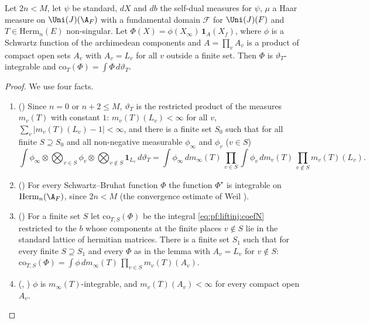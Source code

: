 \begin{lemma}\label{pf:liftinj:swpure}
Let $2n<M$, let $\psi$ be standard, $dX$ and $db$ the self-dual measures for $\psi$, $\mu$ a Haar measure on $\Uni(J)(\A_F)$ with a
fundamental domain $\mathcal F$ for $\Uni(J)(F)$ and $T\in\mathrm{Herm}_n(E)$ non-singular. Let $\Phi(X)=\phi(X_\infty)\,\mathbf 1_A(X_f)$, where $\phi$
is a Schwartz function of the archimedean components and $A=\prod_vA_v$ is a product of compact open sets $A_v$ with $A_v=L_v$ for all $v$
outside a finite set. Then $\Phi$ is $\vartheta_T$-integrable and $\mathrm{co}_T(\Phi)=\int\Phi\,d\vartheta_T$.
\end{lemma}

\begin{proof}
We use four facts.
\begin{enumerate}[label=(\alph*)]
\item () Since $n=0$ or $n+2\le M$, $\vartheta_T$ is the restricted product
of the measures $m_v(T)$ with constant $1$: $m_v(T)(L_v)<\infty$ for all $v$, $\sum_v|m_v(T)(L_v)-1|<\infty$, and there is a finite set $S_0$
such that for all finite $S\supseteq S_0$ and all non-negative measurable $\phi_\infty$ and $\phi_v$ ($v\in S$)
\[
\int\phi_\infty\otimes\bigotimes_{v\in S}\phi_v\otimes\bigotimes_{v\notin S}\mathbf 1_{L_v}\,d\vartheta_T
=\int\phi_\infty\,dm_\infty(T)\,\prod_{v\in S}\int\phi_v\,dm_v(T)\,\prod_{v\notin S}m_v(T)(L_v).
\]
\item () For every Schwartz--Bruhat function $\Phi$ the function $\Phi^\star$ is
integrable on $\mathrm{Herm}_n(\A_F)$, since $2n<M$ (the convergence estimate of Weil \cite{Weil1965}).
\item () For a finite set $S$ let $\mathrm{co}_{T,S}(\Phi)$ be the integral
\eqref{eq:pf:liftinj:coefN} restricted to the $b$ whose components at the finite places $v\notin S$ lie in the standard lattice of hermitian
matrices. There is a finite set $S_1$ such that for every finite $S\supseteq S_1$ and every $\Phi$ as in the lemma with $A_v=L_v$ for
$v\notin S$: $\mathrm{co}_{T,S}(\Phi)=\int\phi\,dm_\infty(T)\,\prod_{v\in S}m_v(T)(A_v)$.
\item (, )
$\phi$ is $m_\infty(T)$-integrable, and $m_v(T)(A_v)<\infty$ for every compact open $A_v$.

\end{enumerate}
\end{proof}
